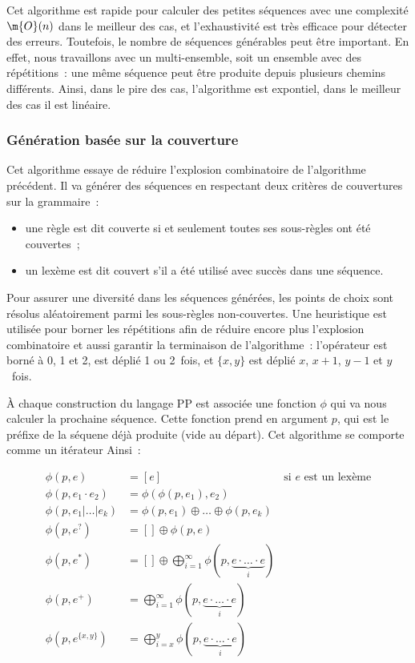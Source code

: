Cet algorithme est rapide pour calculer des petites séquences avec une
complexité $\m{O}(n)$ dans le meilleur des cas, et l'exhaustivité est très
efficace pour détecter des erreurs. Toutefois, le nombre de séquences générables
peut être important. En effet, nous travaillons avec un multi-ensemble, soit un
ensemble avec des répétitions~: une même séquence peut être produite depuis
plusieurs chemins différents. Ainsi, dans le pire des cas, l'algorithme est
expontiel, dans le meilleur des cas il est linéaire.

\subsubsection{Génération basée sur la couverture}
\label{subsection:data:coverage_based_generation}

Cet algorithme essaye de réduire l'explosion combinatoire de l'algorithme
précédent. Il va générer des séquences en respectant deux critères de
couvertures sur la grammaire~:
%
\begin{itemize}

\item une règle est dit couverte si et seulement toutes ses sous-règles ont été
couvertes~;

\item un lexème est dit couvert s'il a été utilisé avec succès dans une
séquence.

\end{itemize}
%
Pour assurer une diversité dans les séquences générées, les points de choix sont
résolus aléatoirement parmi les sous-règles non-couvertes. Une heuristique est
utilisée pour borner les répétitions afin de réduire encore plus l'explosion
combinatoire et aussi garantir la terminaison de l'algorithme~: l'opérateur
\code{*} est borné à 0, 1 et 2, \code{+} est déplié 1 ou 2~fois, et $\{x, y\}$
est déplié $x$, $x + 1$, $y - 1$ et $y$~fois.

À chaque construction du langage PP est associée une fonction $\phi$ qui va nous
calculer la prochaine séquence. Cette fonction prend en argument $p$, qui est le
préfixe de la séquene déjà produite (vide au départ). Cet algorithme se comporte
comme un itérateur Ainsi~:

\begin{align*}
%
\phi(p, e) & =
    [e]
    &
    \text{si $e$ est un lexème}
    \\
%
\phi(p, e_1 \cdot e_2) & =
    \phi(\phi(p, e_1), e_2)
    \\
%
\phi(p, e_1 \vert \dotso \vert e_k) & =
    \phi(p, e_1) \oplus \dotso \oplus \phi(p, e_k)
    \\
%
\phi(p, e^?) & =
    [] \oplus \phi(p, e)
    \\
%
\phi(p, e^*) & =
    [] \oplus \bigoplus_{i = 1}^\infty
    \phi(p, \underbrace{e \cdot \dotso \cdot e}_i)
    \\
%
\phi(p, e^+) & =
    \bigoplus_{i = 1}^\infty \phi(p, \underbrace{e \cdot \dotso \cdot e}_i)
    \\
%
\phi(p, e^{\{x, y\}}) & =
    \bigoplus_{i = x}^y \phi(p, \underbrace{e \cdot \dotso \cdot e}_i)
%
\end{align*}

